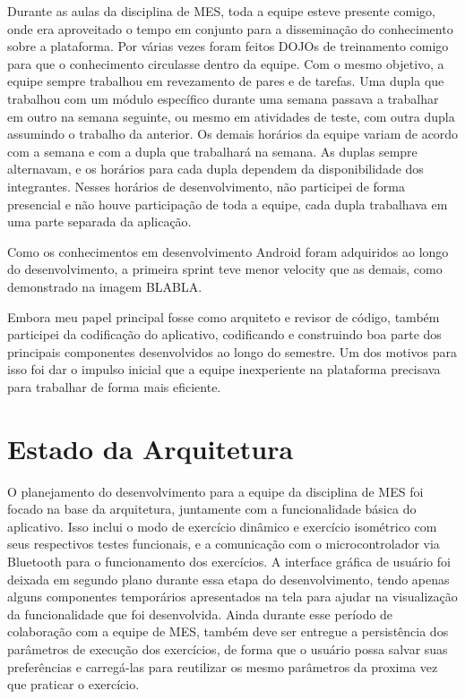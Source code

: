 Durante as aulas da disciplina de MES, toda a equipe esteve presente comigo, onde era aproveitado o tempo em conjunto para a disseminação do conhecimento sobre a plataforma. Por várias vezes foram feitos DOJOs de treinamento comigo para que o conhecimento circulasse dentro da equipe. Com o mesmo objetivo, a equipe sempre trabalhou em revezamento de pares e de tarefas. Uma dupla que trabalhou com um módulo específico durante uma semana passava a trabalhar em outro na semana seguinte, ou mesmo em atividades de teste, com outra dupla assumindo o trabalho da anterior. Os demais horários da equipe variam de acordo com a semana e com a dupla que trabalhará na semana. As duplas sempre alternavam, e os horários para cada dupla dependem da disponibilidade dos integrantes. Nesses horários de desenvolvimento, não participei de forma presencial e não houve participação de toda a equipe, cada dupla trabalhava em uma parte separada da aplicação.

Como os conhecimentos em desenvolvimento Android foram adquiridos ao longo do desenvolvimento, a primeira sprint teve menor velocity que as demais, como demonstrado na imagem BLABLA.

Embora meu papel principal fosse como arquiteto e revisor de código, também participei da codificação do aplicativo, codificando e construindo boa parte dos principais componentes desenvolvidos ao longo do semestre. Um dos motivos para isso foi dar o impulso inicial que a equipe inexperiente na plataforma precisava para trabalhar de forma mais eficiente.

\section{Estado da Arquitetura}

O planejamento do desenvolvimento para a equipe da disciplina de MES foi focado na base da arquitetura, juntamente com a funcionalidade básica do aplicativo. Isso inclui o modo de exercício dinâmico e exercício isométrico com seus respectivos testes funcionais, e a comunicação com o microcontrolador via Bluetooth para o funcionamento dos exercícios. A interface gráfica de usuário foi deixada em segundo plano durante essa etapa do desenvolvimento, tendo apenas alguns componentes temporários apresentados na tela para ajudar na visualização da funcionalidade que foi desenvolvida. Ainda durante esse período de colaboração com a equipe de MES, também deve ser entregue a persistência dos parâmetros de execução dos exercícios, de forma que o usuário possa salvar suas preferências e carregá-las para reutilizar os mesmo parâmetros da proxima vez que praticar o exercício.


